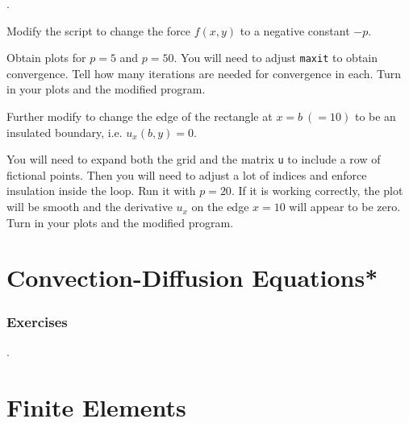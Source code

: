 \begin{list}
{.}{}

\item Modify the script  to change the force $f(x,y)$ to a negative constant $-p$.
   
  Obtain plots for $p=5$ and $p=50$. You will need to adjust \verb&maxit& to obtain convergence. 
  Tell how many iterations are needed for convergence in each. Turn in your plots and the modified program.
  
\item Further modify   to change the edge of the rectangle at $x = b \ (= 10)$ 
     to be an insulated boundary,  i.e.  $u_x(b,y) =0$. 
     
     You will need to expand both the grid and the matrix \verb&u& to include a row of fictional points. 
     Then you will need to adjust a lot of indices and enforce insulation inside the loop.
     Run it with $p = 20$. 
     If it is working correctly, the plot will be smooth and the derivative $u_x$ on the edge $x = 10$ 
     will appear to be zero. Turn in your plots and the modified program.
  

\end{list}



\chapter{Convection-Diffusion Equations*}


\subsection*{Exercises}

\begin{list}
{.}{}

\item

\end{list}





\chapter{Finite Elements}
\label{sec:finiteelements}

